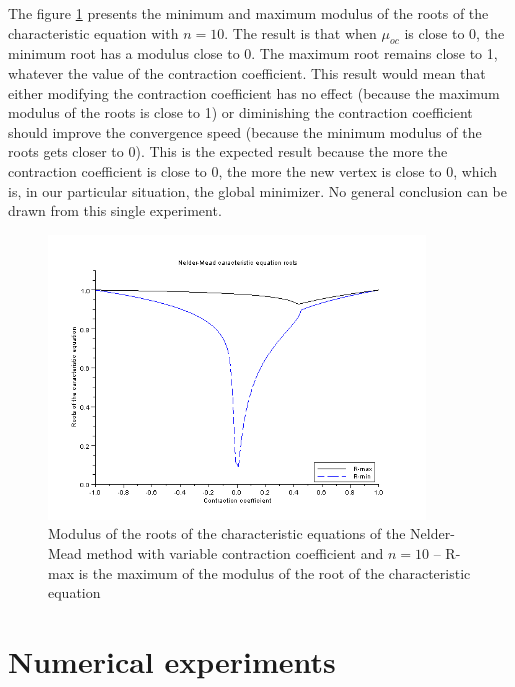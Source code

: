 The figure \ref{fig-nm-roots-variable} presents the minimum
and maximum modulus of the roots of the characteristic equation
with $n=10$. The result is that when $\mu_{oc}$ is close to 0, the 
minimum root has a modulus close to 0. The maximum root remains close to 
1, whatever the value of the contraction coefficient.
This result would mean that either modifying the contraction
coefficient has no effect (because the maximum modulus of the roots 
is close to 1) or diminishing the contraction coefficient should 
improve the convergence speed (because the minimum modulus of the 
roots gets closer to 0). This is the expected result because
the more the contraction coefficient is close to 0, the more the new 
vertex is close to 0, which is, in our particular situation, the 
global minimizer. No general conclusion can be drawn from this single 
experiment.

\begin{figure}
\begin{center}
\includegraphics[width=10cm]{neldermead-roots-variable.png}
\end{center}
\caption{Modulus of the roots of the characteristic equations of the Nelder-Mead method with variable 
contraction coefficient and $n=10$ -- R-max is the maximum of the modulus of the root of the 
characteristic equation}
\label{fig-nm-roots-variable}
\end{figure}

\section{Numerical experiments}

